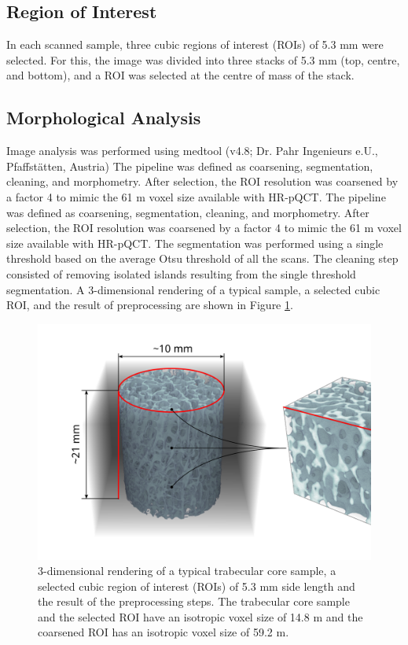 \documentclass[a4paper,fleqn]{DC_ArtStyle}
\begin{document}
	\subsection{Region of Interest}
	In each scanned sample, three cubic regions of interest (ROIs) of 5.3 mm were selected.
	For this, the image was divided into three stacks of 5.3 mm (top, centre, and bottom), and a ROI was selected at the centre of mass of the stack.

	\subsection{Morphological Analysis}
	Image analysis was performed using medtool (v4.8; Dr. Pahr Ingenieurs e.U., Pfaffstätten, Austria)
	The pipeline was defined as coarsening, segmentation, cleaning, and morphometry.
	After selection, the ROI resolution was coarsened by a factor 4 to mimic the 61 \textmu m voxel size available with HR-pQCT.
	The pipeline was defined as coarsening, segmentation, cleaning, and morphometry.
	After selection, the ROI resolution was coarsened by a factor 4 to mimic the 61 \textmu m voxel size available with HR-pQCT.
	The segmentation was performed using a single threshold based on the average Otsu threshold \cite{Otsu1979} of all the scans.
	The cleaning step consisted of removing isolated islands resulting from the single threshold segmentation.
	A 3-dimensional rendering of a typical sample, a selected cubic ROI, and the result of preprocessing are shown in Figure \ref{FigSample}.
	\begin{figure}
		\includegraphics[width=\linewidth]{SampleNew}
		\caption{3-dimensional rendering of a typical trabecular core sample, a selected cubic region of interest (ROIs) of 5.3 mm side length and the result of the preprocessing steps.
			     The trabecular core sample and the selected ROI have an isotropic voxel size of 14.8 \textmu m and the coarsened ROI has an isotropic voxel size of 59.2 \textmu m.}
		\label{FigSample}
	\end{figure}
\end{document}

